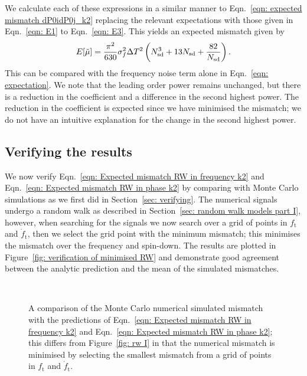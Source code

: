 \documentclass[../full_thesis/full_thesis.tex]{subfiles}
\begin{document}
We calculate each of these expressions in a similar manner to Eqn.~\eqref{eqn:
expected mismatch dP0idP0j_k2} replacing the relevant expectations with those
given in Eqn.~\eqref{eqn: E1} to Eqn.~\eqref{eqn: E3}. This yields an expected
mismatch given by
\begin{equation}
E[\tilde{\mu}] = \frac{\pi^{2} }{630} \sigma_{f}^{2} \Delta T^{2}  \left(N_{\textrm{sd}}^{3} + 13N_{\textrm{sd}} + \frac{82}{N_{\textrm{sd}}} \right).
\label{eqn: Expected mismatch RW in frequency k2}
\end{equation}
This can be compared with the frequency noise term alone in Eqn.~\eqref{eqn:
expectation}. We note that the leading order power remains unchanged, but there
is a reduction in the coefficient and a difference in the second highest
power. The reduction in the coefficient is expected since we have minimised
the mismatch; we do not have an intuitive explanation for the change in the
second highest power.

\subsection{Verifying the results}
\label{sec: verifying minimised}

We now verify Eqn.~\eqref{eqn: Expected mismatch RW in frequency k2} and
Eqn.~\eqref{eqn: Expected mismatch RW in phase k2} by comparing with Monte
Carlo simulations as we first did in Section~\ref{sec: verifying}. The
numerical signals undergo a random walk as described in Section~\ref{sec:
random walk models part I}, however, when searching for the signals we now search
over a grid of points in $f_\textrm{t}$ and $\dot{f}_\textrm{t}$, then we
select the grid point with the minimum mismatch; this minimises the mismatch
over the frequency and spin-down. The results are plotted in Figure~\ref{fig:
verification of minimised RW} and demonstrate good agreement between the
analytic prediction and the mean of the simulated mismatches.

\begin{figure}[ht]
\centering
{}
\\
\caption{A comparison of the Monte Carlo numerical simulated mismatch with the
predictions of Eqn.~\eqref{eqn: Expected mismatch RW in
frequency k2} and Eqn.~\eqref{eqn: Expected mismatch RW in phase k2}; this differs
from Figure~\ref{fig: rw I} in that the numerical mismatch is minimised by selecting
the smallest mismatch from a grid of points in $f_\textrm{t}$ and $\dot{f}_\textrm{t}$.}
\label{fig: verification of minimised RW}
\end{figure}
\end{document}

